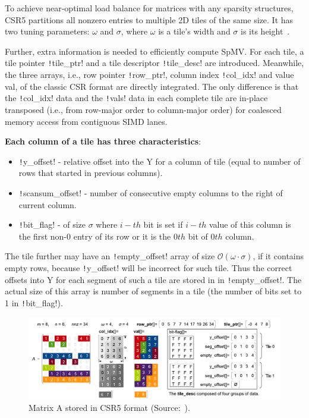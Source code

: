 \documentclass[thesis=M,english]{FITthesis}[2019/12/23]
\newcommand{\csre}[1]{\texttt!#1!}
\begin{document}
To achieve near-optimal load balance for matrices with any sparsity structures,
CSR5 partitions all nonzero entries to multiple 2D tiles of the same size.
It has two tuning parameters: \(\omega{}\) and \(\sigma{}\), where \(\omega{}\)
is a tile’s width and \(\sigma{}\) is its height~\cite{liu2015csr5}.

Further, extra information is needed to efficiently compute SpMV\@.
For each tile, a tile pointer \csre{tile_ptr} and a tile descriptor \csre{tile_desc} are introduced.
Meanwhile, the three arrays, i.e., row pointer \csre{row_ptr}, column index \csre{col_idx} and value val,
of the classic CSR format are directly integrated. The only difference is that the \csre{col_idx} data and the \csre{vals}
data in each complete tile are in-place transposed (i.e., from row-major order to column-major order) for coalesced memory access from contiguous SIMD lanes.


\textbf{Each column of a tile has three characteristics}:
\begin{itemize}
    \item \csre{y_offset} - relative offset into the Y for a column of tile (equal to number of rows that started in previous columns).
    \item \csre{scansum_offset} - number of consecutive empty columns to the right of current column.
    \item \csre{bit_flag} - of size $\sigma$ where $i-th$ bit is set if $i-th$ value of this column is the first non-0 entry of its row
          or it is the $0th$ bit of $0th$ column.
\end{itemize}

The tile further may have an \csre{empty_offset} array of size \(\mathcal{O}(\omega \cdot \sigma)\), if it contains empty rows,
because \csre{y_offset} will be incorrect for such tile. Thus the correct offsets into Y  for each segment of such
a tile are stored in in \csre{empty_offset}. The actual size of this array is number of segments in a tile (the number of bits set to 1 in \csre{bit_flag}).

\begin{figure}[htp]
    \centering
    \includegraphics[scale=0.7]{static/A_csr5.pdf}
    \caption{Matrix A stored in CSR5 format (Source:~\cite{liu2015csr5}).}
\end{figure}
\end{document}
